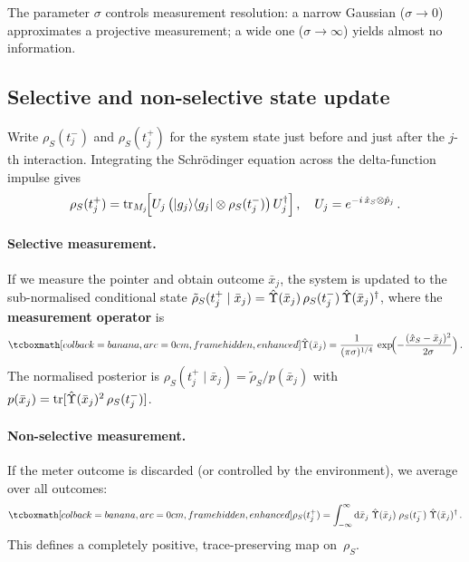 \begin{remark}
  The parameter $\sigma$ controls measurement resolution: a narrow
  Gaussian ($\sigma \to 0$) approximates a projective measurement;
  a wide one ($\sigma \to \infty$) yields almost no information.
\end{remark}

\subsection{Selective and non-selective state update}%
\label{sec:state-update}

Write $\rho_S(t_j^-)$ and $\rho_S(t_j^+)$ for the system state
just before and just after the $j$-th interaction.  Integrating the
Schr\"odinger equation across the delta-function impulse gives
\begin{equation}\label{eq:post-impulse}
  \rho_S(t_j^+)
  = \operatorname{tr}_{M_j}\!\Bigl[
      U_j\,\bigl(\lvert g_j \rangle\langle g_j \rvert \otimes \rho_S(t_j^-)\bigr)\,
      U_j^\dagger \Bigr]\,,
  \quad U_j = e^{-i\,\hat{x}_S \otimes \hat{p}_j}\,.
\end{equation}

\paragraph{Selective measurement.}
If we measure the pointer and obtain outcome $\bar{x}_j$, the
system is updated to the sub-normalised conditional state
$\tilde{\rho}_S(t_j^+ \mid \bar{x}_j)
= \hat{\Upsilon}(\bar{x}_j)\,\rho_S(t_j^-)\,
  \hat{\Upsilon}(\bar{x}_j)^\dagger$,
where the \textbf{measurement operator} is
\begin{equation}\label{eq:upsilon-op}
  \eqbox{\hat{\Upsilon}(\bar{x}_j)
  = \frac{1}{(\pi\sigma)^{1/4}}\,
    \exp\!\Bigl(-\frac{(\hat{x}_S - \bar{x}_j)^2}{2\sigma}
    \Bigr)}\,.
\end{equation}
The normalised posterior is
$\rho_S(t_j^+ \mid \bar{x}_j)
= \tilde{\rho}_S / p(\bar{x}_j)$ with
$p(\bar{x}_j)
= \operatorname{tr}[\hat{\Upsilon}(\bar{x}_j)^2\,\rho_S(t_j^-)]$.

\paragraph{Non-selective measurement.}
If the meter outcome is discarded (or controlled by the
environment), we average over all outcomes:
\begin{equation}\label{eq:nonselective-update}
  \eqbox{\rho_S(t_j^+)
  = \int_{-\infty}^{\infty}\dd\bar{x}_j\;
    \hat{\Upsilon}(\bar{x}_j)\;\rho_S(t_j^-)\;
    \hat{\Upsilon}(\bar{x}_j)^\adj}\,.
\end{equation}
This defines a completely positive, trace-preserving map on~$\rho_S$.

